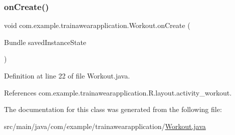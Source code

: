 \subsubsection{\texorpdfstring{onCreate()}{onCreate()}}
{\footnotesize\ttfamily void com.\+example.\+trainawearapplication.\+Workout.\+on\+Create (\begin{DoxyParamCaption}\item[{Bundle}]{saved\+Instance\+State }\end{DoxyParamCaption})\hspace{0.3cm}{\ttfamily [protected]}}



Definition at line 22 of file Workout.\+java.


\begin{DoxyCode}{0}

\end{DoxyCode}


References com.\+example.\+trainawearapplication.\+R.\+layout.\+activity\+\_\+workout.



The documentation for this class was generated from the following file\+:\begin{DoxyCompactItemize}
\item 
src/main/java/com/example/trainawearapplication/\mbox{\hyperlink{_workout_8java}{Workout.\+java}}\end{DoxyCompactItemize}
